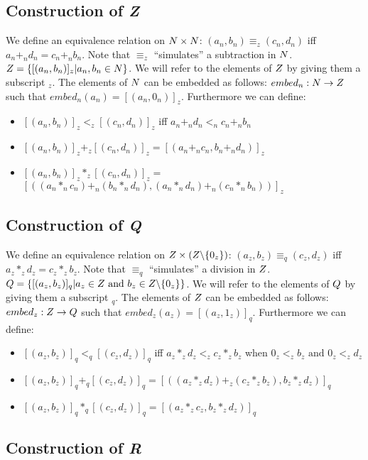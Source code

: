 \subsection{Construction of \sl Z}

We define an equivalence relation on $N \times N$: $(a_n,b_n) \equiv_z
(c_n,d_n)$ iff $a_n +_n d_n = c_n +_n b_n$. Note that $\equiv_z$
``simulates'' a subtraction in $N$. $Z = \{[(a_n,b_n)]_z | a_n, b_n
\in N\}$. We will refer to the elements of $Z$ by giving them a
subscript $_z$.  The elements of $N$ can be embedded as follows:
$embed_n: N \rightarrow Z$ such that $embed_n(a_n) =
[(a_n,0_n)]_z$. Furthermore we can define:
\begin{itemize}
  \item $[(a_n,b_n)]_z <_z [(c_n,d_n)]_z$ iff $a_n +_n d_n <_n c_n +_n b_n$
  \item $[(a_n,b_n)]_z +_z [(c_n,d_n)]_z = [(a_n +_n c_n, b_n +_n d_n)]_z$
  \item $[(a_n,b_n)]_z *_z [(c_n,d_n)]_z =$ \\
        $[\left((a_n *_n c_n) +_n (b_n *_n d_n), (a_n *_n d_n) +_n (c_n *_n
          b_n)\right)]_z$
\end{itemize}

\subsection{Construction of \sl Q}

We define an equivalence relation on $Z \times (Z \backslash
\{0_z\})$: $(a_z,b_z) \equiv_q (c_z,d_z)$ iff $a_z *_z d_z = c_z *_z
b_z$. Note that $\equiv_q$ ``simulates'' a division in $Z$. $Q =
\{[(a_z,b_z)]_q | a_z \in Z \mbox{ and } b_z \in Z \backslash
\{0_z\}\}$. We will refer to the elements of $Q$ by giving them a
subscript $_q$. The elements of $Z$ can be embedded as follows:
$embed_z: Z \rightarrow Q$ such that $embed_z(a_z) =
[(a_z,1_z)]_q$. Furthermore we can define:
\begin{itemize}
  \item $[(a_z,b_z)]_q <_q [(c_z,d_z)]_q$ iff $a_z *_z d_z <_z c_z *_z b_z$
  when $0_z <_z b_z \mbox{ and } 0_z <_z d_z$
  \item $[(a_z,b_z)]_q +_q [(c_z,d_z)]_q = [\left((a_z *_z d_z) +_z (c_z *_z
    b_z), b_z *_z d_z\right)]_q$
  \item $[(a_z,b_z)]_q *_q [(c_z,d_z)]_q = [(a_z *_z c_z, b_z *_z d_z)]_q$
\end{itemize}

\subsection{Construction of \sl R}

